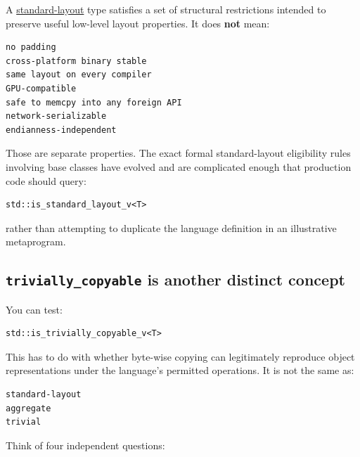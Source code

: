 A \hyperref[appendix-958870a64c53]{standard-layout} type satisfies a set of structural restrictions intended to preserve useful low-level layout properties. It does \textbf{not} mean:

\begin{verbatim}
no padding
cross-platform binary stable
same layout on every compiler
GPU-compatible
safe to memcpy into any foreign API
network-serializable
endianness-independent
\end{verbatim}

Those are separate properties. The exact formal standard-layout eligibility rules involving base classes have evolved and are complicated enough that production code should query:

\begin{verbatim}
std::is_standard_layout_v<T>
\end{verbatim}

rather than attempting to duplicate the language definition in an illustrative metaprogram.

\subsection{\texorpdfstring{\texttt{trivially\_copyable} is another distinct concept}{trivially\_copyable is another distinct concept}}\label{05-engine-i-ch003-trivially_copyable-is-another-distinct-concept}

You can test:

\begin{verbatim}
std::is_trivially_copyable_v<T>
\end{verbatim}

This has to do with whether byte-wise copying can legitimately reproduce object representations under the language's permitted operations. It is not the same as:

\begin{verbatim}
standard-layout
aggregate
trivial
\end{verbatim}

Think of four independent questions:

